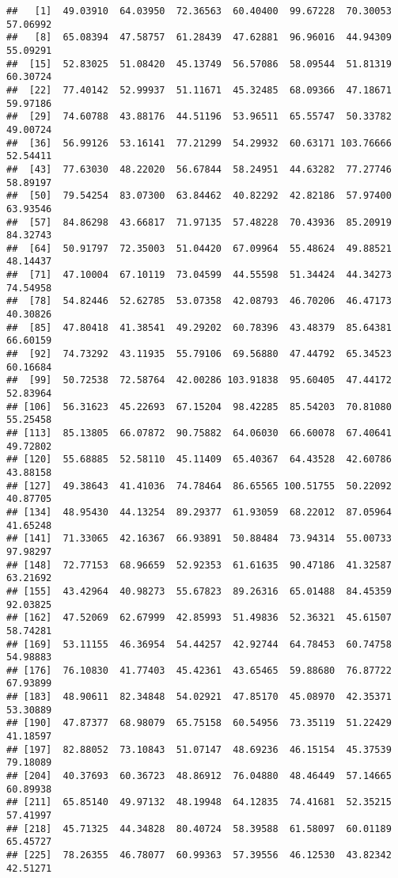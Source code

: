 \documentclass[
]{article}
\begin{document}
\begin{verbatim}
##   [1]  49.03910  64.03950  72.36563  60.40400  99.67228  70.30053  57.06992
##   [8]  65.08394  47.58757  61.28439  47.62881  96.96016  44.94309  55.09291
##  [15]  52.83025  51.08420  45.13749  56.57086  58.09544  51.81319  60.30724
##  [22]  77.40142  52.99937  51.11671  45.32485  68.09366  47.18671  59.97186
##  [29]  74.60788  43.88176  44.51196  53.96511  65.55747  50.33782  49.00724
##  [36]  56.99126  53.16141  77.21299  54.29932  60.63171 103.76666  52.54411
##  [43]  77.63030  48.22020  56.67844  58.24951  44.63282  77.27746  58.89197
##  [50]  79.54254  83.07300  63.84462  40.82292  42.82186  57.97400  63.93546
##  [57]  84.86298  43.66817  71.97135  57.48228  70.43936  85.20919  84.32743
##  [64]  50.91797  72.35003  51.04420  67.09964  55.48624  49.88521  48.14437
##  [71]  47.10004  67.10119  73.04599  44.55598  51.34424  44.34273  74.54958
##  [78]  54.82446  52.62785  53.07358  42.08793  46.70206  46.47173  40.30826
##  [85]  47.80418  41.38541  49.29202  60.78396  43.48379  85.64381  66.60159
##  [92]  74.73292  43.11935  55.79106  69.56880  47.44792  65.34523  60.16684
##  [99]  50.72538  72.58764  42.00286 103.91838  95.60405  47.44172  52.83964
## [106]  56.31623  45.22693  67.15204  98.42285  85.54203  70.81080  55.25458
## [113]  85.13805  66.07872  90.75882  64.06030  66.60078  67.40641  49.72802
## [120]  55.68885  52.58110  45.11409  65.40367  64.43528  42.60786  43.88158
## [127]  49.38643  41.41036  74.78464  86.65565 100.51755  50.22092  40.87705
## [134]  48.95430  44.13254  89.29377  61.93059  68.22012  87.05964  41.65248
## [141]  71.33065  42.16367  66.93891  50.88484  73.94314  55.00733  97.98297
## [148]  72.77153  68.96659  52.92353  61.61635  90.47186  41.32587  63.21692
## [155]  43.42964  40.98273  55.67823  89.26316  65.01488  84.45359  92.03825
## [162]  47.52069  62.67999  42.85993  51.49836  52.36321  45.61507  58.74281
## [169]  53.11155  46.36954  54.44257  42.92744  64.78453  60.74758  54.98883
## [176]  76.10830  41.77403  45.42361  43.65465  59.88680  76.87722  67.93899
## [183]  48.90611  82.34848  54.02921  47.85170  45.08970  42.35371  53.30889
## [190]  47.87377  68.98079  65.75158  60.54956  73.35119  51.22429  41.18597
## [197]  82.88052  73.10843  51.07147  48.69236  46.15154  45.37539  79.18089
## [204]  40.37693  60.36723  48.86912  76.04880  48.46449  57.14665  60.89938
## [211]  65.85140  49.97132  48.19948  64.12835  74.41681  52.35215  57.41997
## [218]  45.71325  44.34828  80.40724  58.39588  61.58097  60.01189  65.45727
## [225]  78.26355  46.78077  60.99363  57.39556  46.12530  43.82342  42.51271

\end{verbatim}
\end{document}
